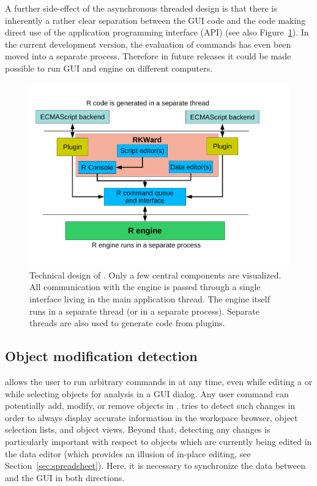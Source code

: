 \documentclass[article,shortnames]{jss}
\begin{document}
A further side-effect of the asynchronous threaded design is that there is
inherently a rather clear separation between the GUI code and the code making direct use
of the  application programming interface (API) (see also Figure~\ref{fig:design_sketch}). 
In the current development version, the evaluation
of  commands has even been moved into a separate process. Therefore in future releases it could 
be made possible to run GUI and  engine on different computers.

\begin{figure}[t!]
 \centering
 \includegraphics[clip=true,trim=0cm 2cm 0cm 0cm]{./figures/design_sketch.pdf}
 \caption{Technical design of . Only a few central components are visualized.
 All communication with the  engine is passed through a single interface living in the main application thread. The  engine itself
 runs in a separate thread (or in a separate process). 
 Separate threads are also used to generate  code from plugins.
}
 \label{fig:design_sketch}
\end{figure}

\subsection{Object modification detection}
\label{sec:technical_omd}
 allows the user to run arbitrary commands in  at any time, even while
editing a  or while selecting objects for analysis in a GUI dialog. Any user
command can potentially add, modify, or remove objects in .  tries to
detect such changes in order to always display accurate information in the
workspace browser, object selection lists, and object views. Beyond that,
detecting any changes is particularly important with respect to objects which
are currently being edited in the data editor (which provides an illusion
of in-place editing, see Section~\ref{sec:spreadsheet}). Here, it is necessary to synchronize
the data between  and the GUI in both directions.
\end{document}
